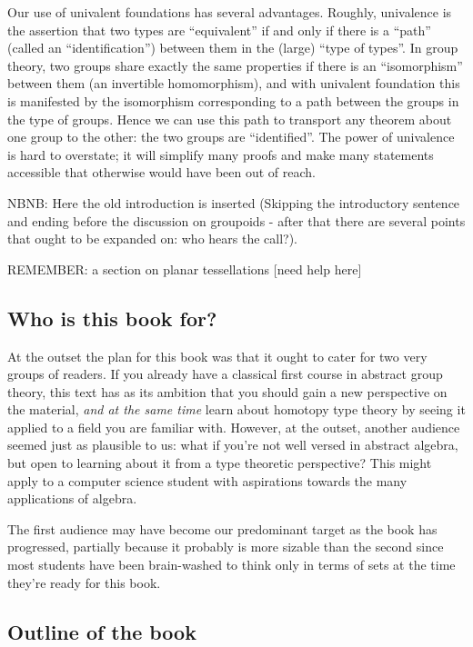 Our use of univalent foundations has several advantages. Roughly, univalence is the assertion that two types are ``equivalent'' if and only if there is a ``path'' (called an ``identification'') between them in the (large) ``type of types''. In group theory, two groups share exactly the same properties if there is an ``isomorphism'' between them (an invertible homomorphism), and with univalent foundation this is manifested by the isomorphism corresponding to a path between the groups in the type of groups. Hence we can use this path to transport any theorem about one group to the other: the two groups are ``identified''. The power of univalence is hard to overstate; it will simplify many proofs and make many statements accessible that otherwise would have been out of reach.



NBNB: Here the old introduction is inserted (Skipping the introductory sentence and ending before the discussion on groupoids - after that there are several points that ought to be expanded on: who hears the call?).

REMEMBER: a section on planar tessellations [need help here]


\subsection{Who is this book for?}
\label{sec:who}
At the outset the plan for this book was that it ought to cater for two very groups of readers. If you already have a classical first course in abstract group theory, this text has as its ambition that you should gain a new perspective on the material, \emph{and at the same time} learn about homotopy type theory by seeing it applied to a field you are familiar with. However, at the outset, another audience seemed just as plausible to us: what if you're not well versed in abstract algebra, but open to learning about it from a type theoretic perspective? This might apply to a computer science student with aspirations towards the many applications of algebra.

The first audience may have become our predominant target as the book has progressed, partially because it probably is more sizable than the second since most students have been brain-washed to think only in terms of sets at the time they're ready for this book.

\subsection{Outline of the book}
\label{sec:outline}

